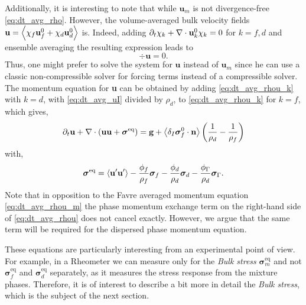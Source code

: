 Additionally, it is interesting to note that while $\textbf{u}_m$ is not divergence-free \eqref{eq:dt_avg_rho}. 
However,  the volume-averaged bulk velocity fields $\textbf{u} = \left<\chi_f \textbf{u}_f^0 + \chi_d \textbf{u}_d^0\right> $ is. 
Indeed, adding $\partial_t \chi_k + \mathbf{\nabla}\cdot \textbf{u}_k^0\chi_k =0$ for $k=f,d$ and ensemble averaging the resulting expression leads to 
\begin{equation}
    \div\textbf{u}=0.
\end{equation}
Thus, one might prefer to solve the system for $\textbf{u}$ instead of $\textbf{u}_m$ since he can use a classic non-compressible solver for forcing terms instead of a compressible solver. 
The momentum equation for \textbf{u} can be obtained by adding \ref{eq:dt_avg_rhou_k} with $k=d$, with \ref{eq:dt_avg_uI} divided by $\rho_d$, to \ref{eq:dt_avg_rhou_k} for $k=f$, which gives, 
\begin{equation}
    \pddt \textbf{u}  
    + \div (
        \textbf{u}\textbf{u}
        + \bm{\sigma}^\text{eq}
    )
    = 
    \textbf{g} 
    +  \avg{\delta_I \bm{\sigma}_f^0 \cdot \textbf{n}} \left(\frac{1}{\rho_d}  - \frac{1}{\rho_f}\right)
    \label{eq:dt_avg_rhou}
\end{equation}
with, 
\begin{equation}
    \bm\sigma^\text{eq} = 
    \left< \textbf{u}'\textbf{u}'\right>
    - \frac{\phi_f}{\rho_f}\bm\sigma_f
    - \frac{\phi_d}{\rho_d}\bm\sigma_d
    - \frac{\phi_\Gamma}{\rho_d} \bm\sigma_\Gamma. 
\end{equation}
Note that in opposition to the Favre averaged momentum equation \eqref{eq:dt_avg_rhou_m} the phase momentum exchange term on the right-hand side of \ref{eq:dt_avg_rhou} does not cancel exactly. 
However, we argue that the same term will be required for the dispersed phase momentum equation.


These equations are particularly interesting from an experimental point of view. 
For example, in a Rheometer we can measure only for the \textit{Bulk stress} $\bm\sigma^\text{eq}_m$ and not $\bm\sigma^\text{eq}_f$ and $\bm\sigma^\text{eq}_d$ separately, as it measures the stress response from the mixture phases. 
Therefore, it is of interest to describe a bit more in detail the \textit{Bulk stress}, which is the subject of the next section.